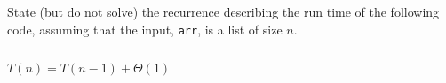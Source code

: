 \begin{prob}
    State (but do not solve) the recurrence describing the run time of the following code,
    assuming that the input, \texttt{arr}, is a list of size $n$.

    \inputminted{python}{./code.py}

    \begin{soln}
        $T(n) = T(n-1) + \Theta(1)$
    \end{soln}

\end{prob}
